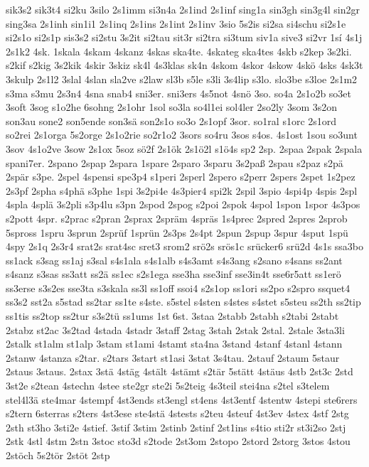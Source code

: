 {sik3s2
sik3t4
si2ku
3silo
2s1imm
si3n4a
2s1ind
2s1inf
sing1a
sin3gh
sin3g4l
sin2gr
sing3sa
2s1inh
sin1i1
2s1inq
2s1ins
2s1int
2s1inv
3sio
5s2is
si2sa
si4schu
si2s1e
si2s1o
si2s1p
sis3s2
si2stu
3s2it
si2tau
sit3r
si2tra
si3tum
siv1a
sive3
si2vr
1sí
4s1j
2s1k2
4sk.
1skala
4skam
4skanz
4skas
ska4te.
4skateg
ska4tes
4skb
s2kep
3s2ki.
s2kif
s2kig
3s2kik
4skir
3skiz
sk4l
4s3klas
sk4n
4skom
4skor
4skow
4skö
4sks
4sk3t
3skulp
2s1l2
3slal
4slan
sla2ve
s2law
sl3b
s5le
s3li
3s4lip
s3lo.
slo3be
s3loe
2s1m2
s3ma
s3mu
2s3n4
4sna
snab4
sni3er.
sni3ers
4s5not
4snö
3so.
so4a
2s1o2b
so3et
3soft
3sog
s1o2he
6sohng
2s1ohr
1sol
so3la
so4l1ei
sol4ler
2so2ly
3som
3s2on
son3au
sone2
son5ende
son3sä
son2s1o
so3o
2s1opf
3sor.
so1ral
s1orc
2s1ord
so2rei
2s1orga
5s2orge
2s1o2rie
so2r1o2
3sors
so4ru
3sos
s4os.
4s1ost
1sou
so3unt
3sov
4s1o2ve
3sow
2s1ox
5soz
sö2f
2s1ök
2s1ö2l
s1ö4s
sp2
2sp.
2spaa
2spak
2spala
spani7er.
2spano
2spap
2spara
1spare
2sparo
3sparu
3s2paß
2spau
s2paz
s2pä
2spär
s3pe.
2spel
4spensi
spe3p4
s1peri
2sperl
2spero
s2perr
2spers
2spet
1s2pez
2s3pf
2spha
s4phä
s3phe
1spi
3s2pi4e
4s3pier4
spi2k
2spil
3spio
4spi4p
4spis
2spl
4spla
4splä
3s2pli
s3p4lu
s3pn
2spod
2spog
s2poi
2spok
4spol
1spon
1spor
4s3pos
s2pott
4spr.
s2prac
s2pran
2sprax
2spräm
4spräs
1s4prec
2spred
2spres
2sprob
5spross
1spru
3sprun
2sprüf
1sprün
2s3ps
2s4pt
2spun
2spup
3spur
4sput
1spü
4spy
2s1q
2s3r4
srat2s
srat4sc
sret3
srom2
srö2s
srös1c
srücker6
srü2d
4s1s
ssa3bo
ss1ack
s3sag
ss1aj
s3sal
s4s1ala
s4s1alb
s4s3amt
s4s3ang
s2sano
s4sans
ss2ant
s4sanz
s3sas
ss3att
ss2ä
ss1ec
s2s1ega
sse3ha
sse3inf
sse3in4t
sse6r5att
ss1erö
ss3erse
s3s2es
sse3ta
s3skala
ss3l
ss1off
ssoi4
s2s1op
ss1ori
ss2po
s2spro
ssquet4
ss3s2
sst2a
s5stad
ss2tar
ss1te
s4ste.
s5stel
s4sten
s4stes
s4stet
s5steu
ss2th
ss2tip
ss1tis
ss2top
ss2tur
s3s2tü
ss1ums
1st
6st.
3staa
2stabb
2stabh
s2tabi
2stabt
2stabz
st2ac
3s2tad
4stada
4stadr
3staff
2stag
3stah
2stak
2stal.
2stale
3sta3li
2stalk
st1alm
st1alp
3stam
st1ami
4stamt
sta4na
3stand
4stanf
4stanl
4stann
2stanw
4stanza
s2tar.
s2tars
3start
st1asi
3stat
3s4tau.
2stauf
2staum
5staur
2staus
3staus.
2stax
3stä
4stäg
4stält
4stämt
s2tär
5stätt
4stäus
4stb
2st3c
2std
3st2e
s2tean
4stechn
4stee
ste2gr
ste2i
5s2teig
4s3teil
stei4na
s2tel
s3telem
stel4l3ä
ste4mar
4stempf
4st3ends
st3engl
st4ens
4st3entf
4stentw
4stepi
ste6rers
s2tern
6sterras
s2ters
4st3ese
ste4stä
4stests
s2teu
4steuf
4st3ev
4stex
4stf
2stg
2sth
st3ho
3sti2e
4stief.
3stif
3stim
2stinb
2stinf
2st1ins
s4tio
sti2r
st3i2so
2stj
2stk
4stl
4stm
2stn
3stoc
sto3d
s2tode
2st3om
2stopo
2stord
2storg
3stos
4stou
2stöch
5s2tör
2stöt
2stp
}
